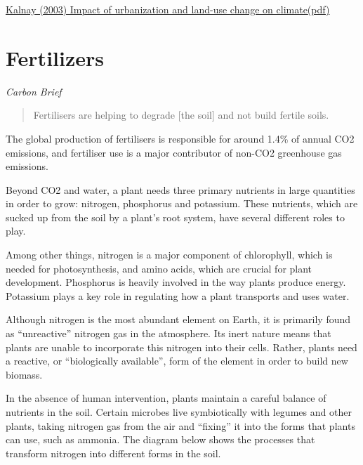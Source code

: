 \documentclass[
]{book}
\begin{document}
\href{https://www.nature.com/articles/nature01675}{Kalnay (2003) Impact of urbanization and land-use change on climate}\href{pdf/Kalnay_2003_Impact_of_Urbanization_and_LUC_on_Climate.pdf}{(pdf)}

\hypertarget{fertilizers}{%
\section{Fertilizers}\label{fertilizers}}

\emph{Carbon Brief}

\begin{quote}
Fertilisers are helping to degrade {[}the soil{]} and not build fertile soils.
\end{quote}

The global production of fertilisers is responsible for around 1.4\% of annual CO2 emissions, and fertiliser use is a major contributor of non-CO2 greenhouse gas emissions.

Beyond CO2 and water, a plant needs three primary nutrients in large quantities in order to grow: nitrogen, phosphorus and potassium. These nutrients, which are sucked up from the soil by a plant's root system, have several different roles to play.

Among other things, nitrogen is a major component of chlorophyll, which is needed for photosynthesis, and amino acids, which are crucial for plant development. Phosphorus is heavily involved in the way plants produce energy. Potassium plays a key role in regulating how a plant transports and uses water.

Although nitrogen is the most abundant element on Earth, it is primarily found as ``unreactive'' nitrogen gas in the atmosphere. Its inert nature means that plants are unable to incorporate this nitrogen into their cells. Rather, plants need a reactive, or ``biologically available'', form of the element in order to build new biomass.

In the absence of human intervention, plants maintain a careful balance of nutrients in the soil. Certain microbes live symbiotically with legumes and other plants, taking nitrogen gas from the air and ``fixing'' it into the forms that plants can use, such as ammonia. The diagram below shows the processes that transform nitrogen into different forms in the soil.
\end{document}
